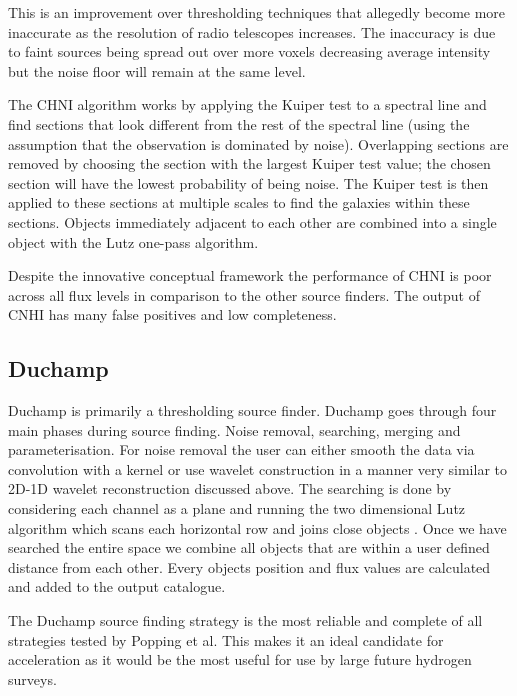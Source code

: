 \documentclass[prodmode,acmtecs]{acmsmall} \usepackage[ruled]{algorithm2e}
\begin{document}
     This is an improvement over thresholding techniques that allegedly become more inaccurate
     as the resolution of radio telescopes increases. The inaccuracy is due to faint sources
     being spread out over more voxels decreasing average intensity but the noise floor will
     remain at the same level. 
     
     The CHNI algorithm works by applying the Kuiper test to a spectral line and find sections 
     that look different from the rest of the spectral line (using the assumption that the
     observation is dominated by noise). Overlapping sections are removed by choosing the 
     section with the largest Kuiper test value; the chosen section will have the lowest probability
     of being noise. The Kuiper test is then applied to these sections at multiple scales to
     find the galaxies within these sections. Objects immediately adjacent to each other
     are combined into a single object with the Lutz one-pass algorithm.
     
     Despite the innovative conceptual framework the performance of CHNI is poor across all
     flux levels in comparison to the other source finders. The output of CNHI has many 
     false positives and low completeness. \cite{popping2012comparison}
     
     \subsection{Duchamp}
Duchamp is primarily a thresholding source finder. Duchamp goes through four main phases during source finding.
Noise removal, searching, merging and parameterisation. For noise removal the user can either smooth the data
via convolution with a kernel or use wavelet construction in a manner very similar to 2D-1D wavelet
reconstruction discussed above. The searching is done by considering each channel as a plane and running the two dimensional
Lutz algorithm which scans each horizontal row and joins close objects \cite{lutz1980algorithm}. Once we have searched the entire
space we combine all objects that are within a user defined distance from each other. Every objects position
and flux values are calculated and added to the output catalogue. \cite{whiting2012duchamp}


The Duchamp source finding strategy  is the most reliable and complete of all strategies tested 
by Popping et al. This makes it an ideal candidate for acceleration as it would
be the most useful for use by large future hydrogen surveys. 
\end{document}
